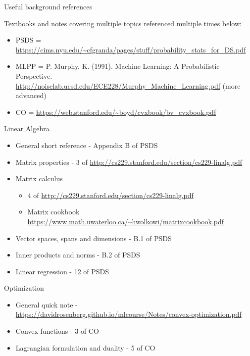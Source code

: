 \documentclass{article}
\newcommand{\nyuparagrah}[1]{\textcolor{nyupurple}{\large #1}}
\begin{document}

\pagestyle{myheadings} 

\begin{center}
{\Large
Useful background references
} 
\end{center}

Textbooks and notes covering multiple topics referenced multiple times below:
\begin{itemize}
    \item PSDS = \url{https://cims.nyu.edu/~cfgranda/pages/stuff/probability_stats_for_DS.pdf}
    \item MLPP = P. Murphy, K. (1991). Machine Learning: A Probabilistic Perspective. \url{http://noiselab.ucsd.edu/ECE228/Murphy_Machine_Learning.pdf} (more advanced)
    \item CO = \url{https://web.stanford.edu/~boyd/cvxbook/bv_cvxbook.pdf}
\end{itemize}


\nyuparagrah{Linear Algebra} 
\begin{itemize}
    \item General short reference -  Appendix B of PSDS
    \item Matrix properties - 3 of \url{http://cs229.stanford.edu/section/cs229-linalg.pdf} 
    \item Matrix calculus 
    \begin{itemize}
        \item 4 of  \url{http://cs229.stanford.edu/section/cs229-linalg.pdf} 
        \item Matrix cookbook \url{https://www.math.uwaterloo.ca/~hwolkowi/matrixcookbook.pdf}
    \end{itemize}
    \item Vector spaces, spans and dimensions - B.1 of PSDS
    \item Inner products and norms - B.2 of PSDS
    \item Linear regression - 12 of PSDS
\end{itemize}

\nyuparagrah{Optimization} 
\begin{itemize}
    \item General quick note - \url{https://davidrosenberg.github.io/mlcourse/Notes/convex-optimization.pdf}
    \item Convex functions - 3 of CO
    \item Lagrangian formulation and duality - 5 of CO
\end{itemize}
\end{document}
